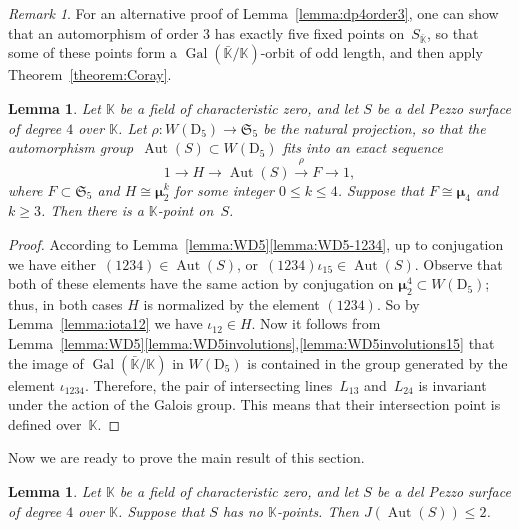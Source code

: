\documentclass[12pt]{amsart}
\newcounter{cequation}[section]
\newtheorem{lemma}[cequation]{Lemma}
\theoremstyle{definition}
\theoremstyle{remark}
\newtheorem{remark}[cequation]{Remark}
\newcommand{\KK}{\mathbb{K}}
\newcommand{\mumu}{{\boldsymbol{\mu}}}
\newcommand{\Aut}{\operatorname{Aut}}
\newcommand{\Gal}{\operatorname{Gal}}
\def \ge {\geqslant}
\def \le {\leqslant}
\begin{document}
\begin{remark}
For an alternative proof of Lemma~\ref{lemma:dp4order3}, one can show that an automorphism
of order $3$ has exactly five fixed points on~$S_{\bar{\KK}}$, so that
some of these points form a $\Gal(\bar{\KK}/\KK)$-orbit of odd length,
and then apply Theorem~\ref{theorem:Coray}.
\end{remark}



\begin{lemma}\label{lemma:dP4-2-group}
Let $\KK$ be a field of characteristic zero, and let $S$ be a del Pezzo surface of degree $4$ over $\KK$.
Let $\rho\colon W(\mathrm{D}_5)\to \mathfrak{S}_5$ be the natural projection, so that the automorphism
group~\mbox{$\Aut(S)\subset W(\mathrm{D}_5)$} fits into an exact sequence
$$
1\to H\longrightarrow \Aut(S) \stackrel{\rho}{\longrightarrow} F\to 1,
$$
where $F\subset \mathfrak{S}_5$ and $H\cong\mumu_2^k$ for some integer $0\le k\le 4$.
Suppose that $F\cong\mumu_4$ and $k\ge 3$. Then there is a $\KK$-point on~$S$.
\end{lemma}

\begin{proof}
According to Lemma~\ref{lemma:WD5}\ref{lemma:WD5-1234},
up to conjugation we have either~\mbox{$(1234) \in \Aut(S)$},
or~\mbox{$(1234)\iota_{15} \in \Aut(S)$}.
Observe that both of these elements have the same action by conjugation on
$\mumu_2^4\subset W(\mathrm{D}_5)$; thus, in both cases $H$ is normalized
by the element $(1234)$.
So by Lemma~\ref{lemma:iota12} we have $\iota_{12} \in H$.
Now it follows from
Lemma~\ref{lemma:WD5}\ref{lemma:WD5involutions},\ref{lemma:WD5involutions15}
that the image of $\Gal(\bar{\KK}/\KK)$ in $W(\mathrm{D}_5)$
is contained in the group generated by the element $\iota_{1234}$.
Therefore, the pair of intersecting lines~$L_{13}$ and~$L_{24}$
is invariant under the action of the Galois group. This means that their intersection point is defined over~$\KK$.
\end{proof}




Now we are ready to prove the main result of this section.


\begin{lemma}\label{lemma:deg-4-bound}
Let $\KK$ be a field of characteristic zero, and let $S$ be a del Pezzo surface of degree $4$ over $\KK$.
Suppose that
$S$ has no $\KK$-points. Then $J(\Aut(S))\le 2$.
\end{lemma}
\end{document}
